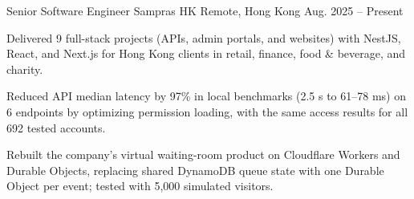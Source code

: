 \resumeExperience
  {Senior Software Engineer}
  {Sampras HK}
  {Remote, Hong Kong}
  {Aug. 2025 -- Present}
  {
    \item Delivered 9 full-stack projects (APIs, admin portals, and websites) with NestJS, React, and Next.js for Hong Kong clients in retail, finance, food \& beverage, and charity.
    \item Reduced API median latency by 97\% in local benchmarks (2.5 s to 61--78 ms) on 6 endpoints by optimizing permission loading, with the same access results for all 692 tested accounts.
    \item Rebuilt the company's virtual waiting-room product on Cloudflare Workers and Durable Objects, replacing shared DynamoDB queue state with one Durable Object per event; tested with 5,000 simulated visitors.
  }

